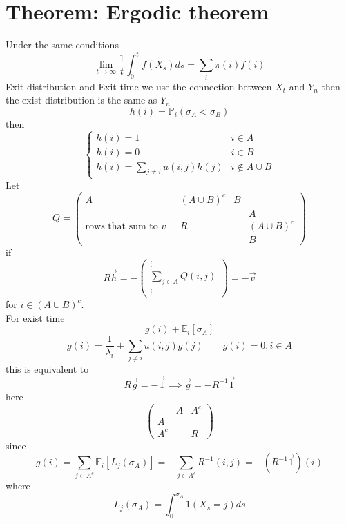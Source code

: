 \documentclass[11pt]{article}
\begin{document}
\section{Theorem: Ergodic theorem}
Under the same conditions
\[
\lim_{t\to \infty} \frac{1}{t} \int_{0}^{t}f(X_s)ds = \sum_{i}^{}\pi(i) f(i)
\] 
Exit distribution and Exit time we use the connection between $X_t$ and  $Y_n$ then the exist distribution is the same as  $Y_n$
 \[
h(i) = \mathbb{P}_i(\sigma_A < \sigma_B)
\] 
then
\[
\begin{cases}
    h(i) = 1 & i \in A\\
    h(i) = 0 & i \in B\\
    h(i) = \sum_{j\ne i}^{}u(i,j)h(j) & i \not\in A \cup B
\end{cases}
\] 
Let
\[
Q = 
\begin{pmatrix} 
    A & (A \cup B)^{c} & B\\
      &  & & A\\
    \text{rows that sum to $v$ } & R & & (A \cup B)^{c} \\
      &  & & B
\end{pmatrix} 
\] 
if 
 \[
 R \vec h = -
 \begin{pmatrix} \vdots \\ \sum_{j \in A}^{}Q(i,j) \\ \vdots  \end{pmatrix}  = - \vec v
\] 
for $i \in (A \cup B)^{c}$.\\
For exist time
\[
    g(i) + \mathbb{E}_i[\sigma_A] 
\] 
\[
g(i) = \frac{1}{\lambda_i} + \sum_{j \ne i}^{}u(i,j) g(j) \qquad g(i) = 0, i \in A
\] 
this is equivalent to
\[
R \vec g = -\vec 1 \implies \vec g = -R^{-1}\vec 1
\] 
here
\[
    \begin{pmatrix} & A & A^{c} \\ A & & \\ A^{c} & & R \end{pmatrix} 
\] 
since
\[
    g(i) = \sum_{j \in A^{c}}^{} \mathbb{E}_i[L_j(\sigma_A)]  = -\sum_{j \in A^{c}}^{} R^{-1}(i,j) = -( R^{-1} \vec 1)(i)
\] 
where
\[
L_j(\sigma_A) = \int_{0}^{\sigma_A} 1(X_s = j) ds
\] 
\end{document}
